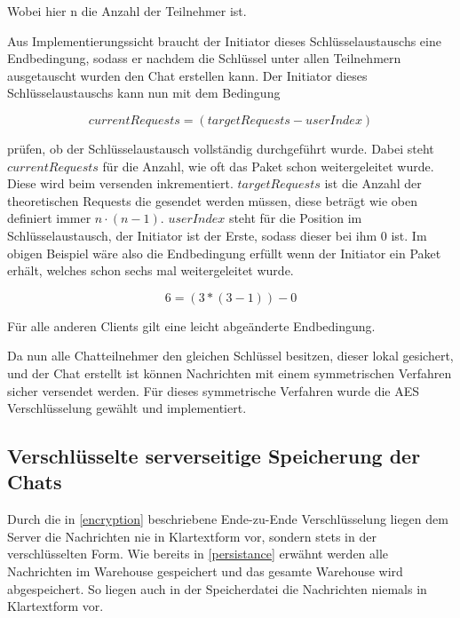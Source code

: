 Wobei hier n die Anzahl der Teilnehmer ist.

Aus Implementierungssicht braucht der Initiator dieses
Schlüsselaustauschs eine Endbedingung, sodass er nachdem
die Schlüssel unter allen Teilnehmern ausgetauscht wurden 
den Chat erstellen kann. Der Initiator dieses Schlüsselaustauschs 
kann nun mit dem Bedingung

$$ currentRequests = (targetRequests - userIndex) $$

prüfen, ob der Schlüsselaustausch vollständig durchgeführt wurde. Dabei steht 
$ currentRequests $ für die Anzahl, wie oft das Paket schon weitergeleitet
wurde. Diese wird beim versenden inkrementiert. $ targetRequests $
ist die Anzahl der theoretischen Requests die gesendet werden müssen, diese
beträgt wie oben definiert immer $ n \cdot (n - 1) $. $ userIndex $ steht
für die Position im Schlüsselaustausch, der Initiator ist der Erste, sodass
dieser bei ihm 0 ist. Im obigen Beispiel wäre also die Endbedingung
erfüllt wenn der Initiator ein Paket erhält, welches schon sechs mal 
weitergeleitet wurde.

$$ 6 = (3 * (3 - 1)) - 0 $$

Für alle anderen Clients gilt eine leicht abgeänderte Endbedingung.

Da nun alle Chatteilnehmer den gleichen Schlüssel besitzen, dieser 
lokal gesichert, und der Chat erstellt ist können Nachrichten mit 
einem symmetrischen Verfahren sicher versendet werden. Für dieses 
symmetrische Verfahren wurde die AES Verschlüsselung gewählt und
implementiert.

\author{Troy Keßler}
\subsection{Verschlüsselte serverseitige Speicherung der Chats}
Durch die in \ref{encryption} beschriebene Ende-zu-Ende Verschlüsselung liegen dem Server die Nachrichten nie in Klartextform vor, sondern stets in der verschlüsselten Form. Wie bereits in \ref{persistance} erwähnt werden alle Nachrichten im Warehouse gespeichert und das gesamte Warehouse wird abgespeichert. So liegen auch in der Speicherdatei die Nachrichten niemals in Klartextform vor.
